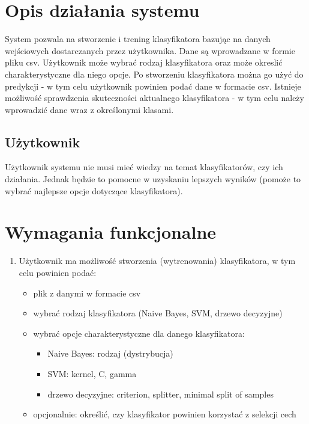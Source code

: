 \documentclass[a4paper, 11pt]{report}
\begin{document}
	\section{Opis działania systemu}
	
	System pozwala na stworzenie i trening klasyfikatora bazując na danych wejściowych dostarczanych przez użytkownika. Dane są wprowadzane w formie pliku csv. Użytkownik może wybrać rodzaj klasyfikatora oraz może okreslić charakterystyczne dla niego opcje. Po stworzeniu klasyfikatora można go użyć do predykcji - w tym celu użytkownik powinien podać dane w formacie csv. Istnieje możliwość sprawdzenia skuteczności aktualnego klasyfikatora - w tym celu należy wprowadzić dane wraz z określonymi klasami.
	
	\subsection{Użytkownik}
	Użytkownik systemu nie musi mieć wiedzy na temat klasyfikatorów, czy ich działania. Jednak będzie to pomocne w uzyskaniu lepszych wyników (pomoże to wybrać najlepsze opcje dotyczące klasyfikatora).
		
	\section{Wymagania funkcjonalne}
	\begin{enumerate}
	\item Użytkownik ma możliwość stworzenia (wytrenowania) klasyfikatora, w tym celu powinien podać:
		\begin{itemize}
		\item plik z danymi w formacie csv 
		\item wybrać rodzaj klasyfikatora (Naive Bayes, SVM, drzewo decyzyjne)
		\item wybrać opcje charakterystyczne dla danego klasyfikatora:
			\begin{itemize}
			\item Naive Bayes: rodzaj (dystrybucja)
			\item SVM: kernel, C, gamma
			\item drzewo decyzyjne: criterion, splitter, minimal split of samples
			\end{itemize}
		\item opcjonalnie: określić, czy klasyfikator powinien korzystać z selekcji cech
		\end{itemize}
	\end{enumerate}
	
\end{document}
